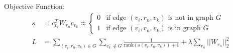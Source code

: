 \documentclass{article}
\begin{document}
Objective Function:
\begin{align}
     s &= c_{v_i}^T W_{r_n} c_{v_k} \approx 
    \begin{cases}
    0 & \text{if edge } (v_i, r_n, v_k) \text{ is not in graph } G \\
    1 & \text{if edge } (v_i, r_n, v_k) \text{ is in graph } G
    \end{cases} \\
    L &= \sum_{(v_i, r_n, v_k) \in G} \sum_{v_k^- \notin G} \frac{1}{\text{rank}(s(v_i, r_n, v_k)) + 1} + \lambda \sum_{r_n} ||W_{r_n}||_2^2
\end{align}
\end{document}
